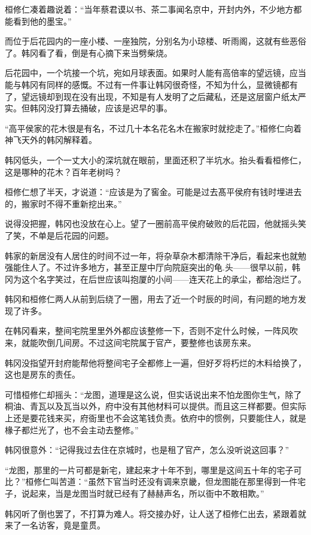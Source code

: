 桓修仁凑着趣说着：“当年蔡君谟以书、茶二事闻名京中，开封内外，不少地方都能看到他的墨宝。”

而位于后花园内的一座小楼、一座独院，分别名为小琼楼、听雨阁，这就有些恶俗了。韩冈看了看，倒是有心摘下来当劈柴烧。

后花园中，一个坑接一个坑，宛如月球表面。如果时人能有高倍率的望远镜，应当能与韩冈有同样的感慨。不过有一件事让韩冈很奇怪，不知为什么，显微镜都有了，望远镜却到现在没有出现，不知是有人发明了之后藏私，还是这层窗户纸太严实。但韩冈没打算去捅破，应该是迟早的事。

“高平侯家的花木很是有名，不过几十本名花名木在搬家时就挖走了。”桓修仁向着神飞天外的韩冈解释着。

韩冈低头，一个一丈大小的深坑就在眼前，里面还积了半坑水。抬头看看桓修仁，这是哪种的花木？百年老树吗？

桓修仁想了半天，才说道：“应该是为了窖金。可能是过去髙平侯府有钱时埋进去的，搬家时不得不重新挖出来。”

说得没把握，韩冈也没放在心上。望了一圈前高平侯府破败的后花园，他就摇头笑了笑，不单是后花园的问题。

韩家的新居没有人居住的时间不过一年，将杂草杂木都清除干净后，看起来也就勉强能住人了。不过许多地方，甚至正屋中厅向院庭突出的龟.头——很早以前，韩冈为这个名字笑过，在后世应该叫抱厦的小间——连天花上的承尘，都给泡烂了。

韩冈和桓修仁两人从前到后绕了一圈，用去了近一个时辰的时间，有问题的地方发现了许多。

在韩冈看来，整间宅院里里外外都应该整修一下，否则不定什么时候，一阵风吹来，就能吹倒几间房。不过这间宅院属于官产，要整修也该房东来。

韩冈没指望开封府能帮他将整间宅子全都修上一遍，但好歹将朽烂的木料给换了，这也是房东的责任。

可惜桓修仁却摇头：“龙图，道理是这么说，但实话说出来不怕龙图你生气，除了桐油、青瓦以及瓦当以外，府中没有其他材料可以提供。而且这三样都要。但实际上还是要花钱来买，府衙里也不会这笔钱负责。依府中的惯例，只要能住人，就是椽子都烂光了，也不会主动去整修。”

韩冈很意外：“记得我过去住在京城时，也是租了官产，怎么没听说这回事？”

“龙图，那里的一片可都是新宅，建起来才十年不到，哪里是这间五十年的宅子可比？”桓修仁叫苦道：“虽然下官当时还没有调来京畿，但龙图能在那里得到一件宅子，说起来，当是龙图当时就已经有了赫赫声名，所以衙中不敢相欺。”

韩冈听了倒也罢了，不打算为难人。将交接办好，让人送了桓修仁出去，紧跟着就来了一名访客，竟是童贯。

